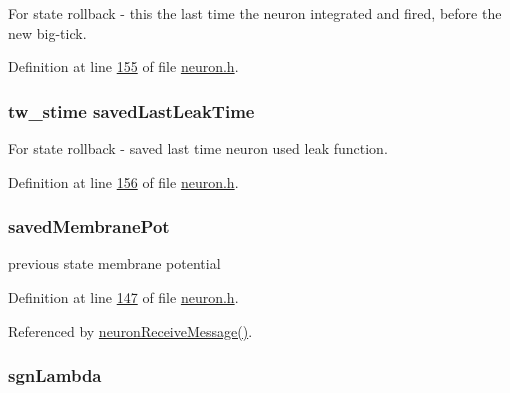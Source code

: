 For state rollback -\/ this the last time the neuron integrated and fired, before the new big-\/tick. 



Definition at line \hyperlink{neuron_8h_source_l00155}{155} of file \hyperlink{neuron_8h_source}{neuron.\+h}.

\hypertarget{structneuron_state_a50734a9ba605a083a90814b63d039a03}{}
\subsubsection[{saved\+Last\+Leak\+Time}]{\setlength{\rightskip}{0pt plus 5cm}tw\+\_\+stime saved\+Last\+Leak\+Time}\label{structneuron_state_a50734a9ba605a083a90814b63d039a03}


For state rollback -\/ saved last time neuron used leak function. 



Definition at line \hyperlink{neuron_8h_source_l00156}{156} of file \hyperlink{neuron_8h_source}{neuron.\+h}.

\hypertarget{structneuron_state_a5efe5de0478ea513ed5d90d89a49fcca}{}
\subsubsection[{saved\+Membrane\+Pot}]{ saved\+Membrane\+Pot}\label{structneuron_state_a5efe5de0478ea513ed5d90d89a49fcca}


previous state membrane potential 



Definition at line \hyperlink{neuron_8h_source_l00147}{147} of file \hyperlink{neuron_8h_source}{neuron.\+h}.



Referenced by \hyperlink{neuron_8c_source_l00104}{neuron\+Receive\+Message()}.

\hypertarget{structneuron_state_a46a71f61511b5311e14643084109d90f}{}
\subsubsection[{sgn\+Lambda}]{ sgn\+Lambda}\label{structneuron_state_a46a71f61511b5311e14643084109d90f}


